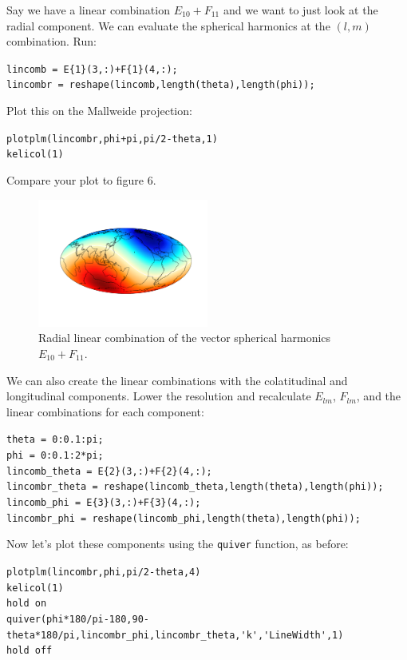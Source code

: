 \documentclass[11pt]{article}
\begin{document}
Say we have a linear combination $E_{10}+F_{11}$ and we want to just look at the radial component.  We can evaluate the spherical harmonics at the $(l,m)$ combination.  Run:

\verb|lincomb = E{1}(3,:)+F{1}(4,:);|\\
\verb|lincombr = reshape(lincomb,length(theta),length(phi));|

Plot this on the Mallweide projection:

\verb|plotplm(lincombr,phi+pi,pi/2-theta,1)|\\
\verb|kelicol(1)|

Compare your plot to figure 6.
\begin{figure}[H]
  \centering
  \includegraphics[width=0.5\textwidth]{figures_Rep2/lincombEF1.png}  
  \caption{Radial linear combination of the vector spherical harmonics $E_{10}+F_{11}$.}
\label{EFcomb}
\end{figure}

We can also create the linear combinations with the colatitudinal and longitudinal components.  Lower the resolution and recalculate $E_{lm}$, $F_{lm}$, and the linear combinations for each component:

\verb|theta = 0:0.1:pi;|\\
\verb|phi = 0:0.1:2*pi;|\\
\verb|lincomb_theta = E{2}(3,:)+F{2}(4,:);|\\
\verb|lincombr_theta = reshape(lincomb_theta,length(theta),length(phi));|\\
\verb|lincomb_phi = E{3}(3,:)+F{3}(4,:);|\\
\verb|lincombr_phi = reshape(lincomb_phi,length(theta),length(phi));|

Now let's plot these components using the \verb|quiver| function, as before:

\verb|plotplm(lincombr,phi,pi/2-theta,4)|\\
\verb|kelicol(1)|\\
\verb|hold on|\\
\verb|quiver(phi*180/pi-180,90-theta*180/pi,lincombr_phi,lincombr_theta,'k','LineWidth',1)|\\
\verb|hold off|
\end{document}
